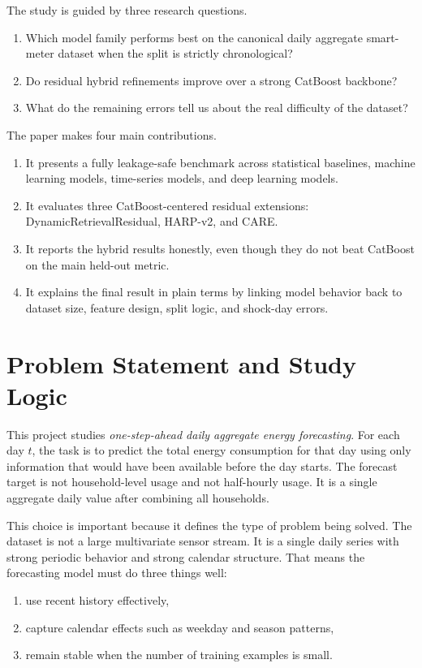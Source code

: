 \documentclass[conference]{IEEEtran}
\begin{document}
The study is guided by three research questions.
\begin{enumerate}
\item Which model family performs best on the canonical daily aggregate smart-meter dataset when the split is strictly chronological?
\item Do residual hybrid refinements improve over a strong CatBoost backbone?
\item What do the remaining errors tell us about the real difficulty of the dataset?
\end{enumerate}

The paper makes four main contributions.
\begin{enumerate}
\item It presents a fully leakage-safe benchmark across statistical baselines, machine learning models, time-series models, and deep learning models.
\item It evaluates three CatBoost-centered residual extensions: DynamicRetrievalResidual, HARP-v2, and CARE.
\item It reports the hybrid results honestly, even though they do not beat CatBoost on the main held-out metric.
\item It explains the final result in plain terms by linking model behavior back to dataset size, feature design, split logic, and shock-day errors.
\end{enumerate}

\section{Problem Statement and Study Logic}
This project studies \emph{one-step-ahead daily aggregate energy forecasting}. For each day $t$, the task is to predict the total energy consumption for that day using only information that would have been available before the day starts. The forecast target is not household-level usage and not half-hourly usage. It is a single aggregate daily value after combining all households.

This choice is important because it defines the type of problem being solved. The dataset is not a large multivariate sensor stream. It is a single daily series with strong periodic behavior and strong calendar structure. That means the forecasting model must do three things well:
\begin{enumerate}
\item use recent history effectively,
\item capture calendar effects such as weekday and season patterns,
\item remain stable when the number of training examples is small.
\end{enumerate}
\end{document}
